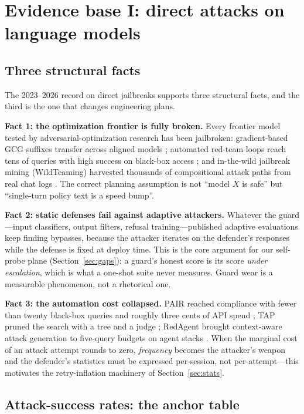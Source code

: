 \section{Evidence base I: direct attacks on language models}\label{sec:evidence}

\subsection{Three structural facts}

The 2023--2026 record on direct jailbreaks supports three structural facts, and the
third is the one that changes engineering plans.

\textbf{Fact 1: the optimization frontier is fully broken.} Every frontier model
tested by adversarial-optimization research has been jailbroken: gradient-based
GCG suffixes transfer across aligned models \cite{gcg}; automated red-team loops
reach tens of queries with high success on black-box access \cite{pair,tap}; and
in-the-wild jailbreak mining (WildTeaming) harvested thousands of compositional
attack paths from real chat logs \cite{wildteaming}. The correct planning
assumption is not ``model $X$ is safe'' but ``single-turn policy text is a
speed bump''.

\textbf{Fact 2: static defenses fail against adaptive attackers.} Whatever the
guard---input classifiers, output filters, refusal training---published
adaptive evaluations keep finding bypasses, because the attacker iterates on the
defender's responses while the defense is fixed at deploy time. This is the core
argument for our self-probe plane (Section~\ref{sec:gaps}): a guard's honest score
is its score \emph{under escalation}, which is what a one-shot suite never
measures. Guard wear is a measurable phenomenon, not a rhetorical one.

\textbf{Fact 3: the automation cost collapsed.} PAIR reached compliance with
fewer than twenty black-box queries and roughly three cents of API spend
\cite{pair}; TAP pruned the search with a tree and a judge \cite{tap}; RedAgent
brought context-aware attack generation to five-query budgets on agent stacks
\cite{redagent}. When the marginal cost of an attack attempt rounds to zero,
\emph{frequency} becomes the attacker's weapon and the defender's statistics must
be expressed per-session, not per-attempt---this motivates the retry-inflation
machinery of Section~\ref{sec:stats}.

\subsection{Attack-success rates: the anchor table}\label{sec:asr}

